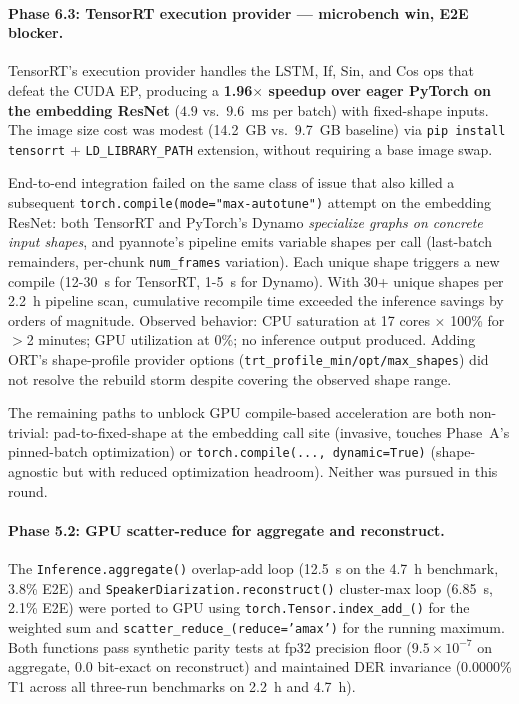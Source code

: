 \documentclass[conference,10pt]{IEEEtran}
\begin{document}
\paragraph{Phase 6.3: TensorRT execution provider --- microbench win, E2E blocker.}
TensorRT's execution provider handles the LSTM, If, Sin, and Cos ops that
defeat the CUDA EP, producing a \textbf{1.96$\times$ speedup over eager
PyTorch on the embedding ResNet} ($4.9$ vs.\ $9.6$~ms per batch) with
fixed-shape inputs. The image size cost was modest
(14.2~GB vs.\ 9.7~GB baseline) via \texttt{pip install tensorrt} +
\texttt{LD\_LIBRARY\_PATH} extension, without requiring a base image swap.

End-to-end integration failed on the same class of issue that also killed a
subsequent \texttt{torch.compile(mode="max-autotune")} attempt on the
embedding ResNet: both TensorRT and PyTorch's Dynamo \emph{specialize graphs
on concrete input shapes}, and pyannote's pipeline emits variable shapes per
call (last-batch remainders, per-chunk \texttt{num\_frames} variation). Each
unique shape triggers a new compile (12-30~s for TensorRT, 1-5~s for Dynamo).
With 30+ unique shapes per 2.2~h pipeline scan, cumulative recompile time
exceeded the inference savings by orders of magnitude. Observed behavior:
CPU saturation at 17 cores $\times$ 100\% for $>$2 minutes; GPU utilization
at 0\%; no inference output produced. Adding ORT's shape-profile provider
options (\texttt{trt\_profile\_min/opt/max\_shapes}) did not resolve the
rebuild storm despite covering the observed shape range.

The remaining paths to unblock GPU compile-based acceleration are both
non-trivial: pad-to-fixed-shape at the embedding call site (invasive,
touches Phase~A's pinned-batch optimization) or
\texttt{torch.compile(..., dynamic=True)} (shape-agnostic but with reduced
optimization headroom). Neither was pursued in this round.

\paragraph{Phase 5.2: GPU scatter-reduce for aggregate and reconstruct.}
The \texttt{Inference.aggregate()} overlap-add loop (12.5~s on the 4.7~h
benchmark, 3.8\% E2E) and \texttt{SpeakerDiarization.reconstruct()} cluster-max
loop (6.85~s, 2.1\% E2E) were ported to GPU using
\texttt{torch.Tensor.index\_add\_()} for the weighted sum and
\texttt{scatter\_reduce\_(reduce='amax')} for the running maximum. Both
functions pass synthetic parity tests at fp32 precision floor
($9.5 \times 10^{-7}$ on aggregate, 0.0 bit-exact on reconstruct) and
maintained DER invariance (0.0000\% T1 across all three-run benchmarks on
2.2~h and 4.7~h).
\end{document}
